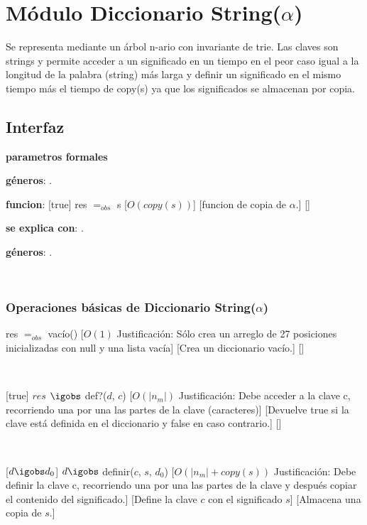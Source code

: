 \section{Módulo Diccionario String($\alpha$)}

Se representa mediante un árbol n-ario con invariante de trie. Las claves son strings y permite acceder a un significado en un tiempo en el peor caso igual a la longitud de la palabra (string) más larga y definir un significado en el mismo tiempo más el tiempo 
de copy(s) ya que los significados se almacenan por copia.

\subsection{Interfaz}

\textbf{parametros formales}

\textbf{géneros}: \TipoVariable{$\alpha$}.

\textbf{funcion}: 
				  [true]
				  {res $=_{obs}$ s}
				  [$O(copy(s))$]
				  [funcion de copia de $\alpha$.]
				  []

\textbf{se explica con}: .

\textbf{géneros}: .



~

\subsubsection{Operaciones básicas de Diccionario String($\alpha$)}

{res $=_{obs}$ vacío()}
[$O(1)$ Justificación: Sólo crea un arreglo de 27 posiciones inicializadas con null y una lista vacía]
[Crea un diccionario vacío.]
[]

~



[true]
{$res$ $\igobs$ def?($d$, $c$)}
[$O(|n_m|)$ Justificación: Debe acceder a la clave c, recorriendo una por una las partes de la clave (caracteres)]
[Devuelve true si la clave está definida en el diccionario y false en caso contrario.]
[]

~

[$ d \igobs d_0 $]
{$ d \igobs$ definir($c$, $s$, $d_0$)}
[$O(|n_m| + copy(s))$ Justificación: Debe definir la clave c, recorriendo una por una las partes de la clave y después copiar el contenido del significado.]
[Define la clave $c$ con el significado $s$]
[Almacena una copia de $s$.]

